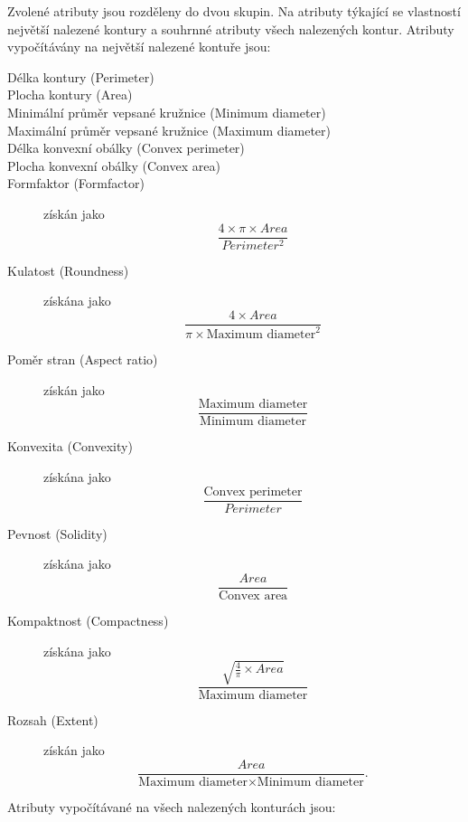 Zvolené atributy jsou rozděleny do dvou skupin. Na atributy týkající se vlastností největší nalezené kontury a souhrnné atributy všech nalezených kontur. Atributy vypočítávány na největší nalezené kontuře jsou:
\begin{description}
\item [Délka kontury (Perimeter)]
\item [Plocha kontury (Area)]
\item [Minimální průměr vepsané kružnice (Minimum diameter)]
\item [Maximální průměr vepsané kružnice (Maximum diameter)]
\item [Délka konvexní obálky (Convex perimeter)]
\item [Plocha konvexní obálky (Convex area)]
\item [Formfaktor (Formfactor)] získán jako 
    \begin{equation}
        \frac{4 \times \pi \times Area}{Perimeter^{2}}        
    \end{equation}
\item [Kulatost (Roundness)] získána jako 
    \begin{equation}
        \frac{4 \times Area}{\pi \times \text{Maximum diameter}^{2}}
    \end{equation}
\item [Poměr stran (Aspect ratio)] získán jako
	\begin{equation}
        \frac{\text{Maximum diameter}}{\text{Minimum diameter}}
	\end{equation}
\item [Konvexita (Convexity)] získána jako
	\begin{equation}
        \frac{\text{Convex perimeter}}{Perimeter}
	\end{equation}
\item [Pevnost (Solidity)] získána jako
	\begin{equation}
        \frac{Area}{\text{Convex area}}
	\end{equation}
\item [Kompaktnost (Compactness)] získána jako
	\begin{equation}
        \frac{\sqrt{\frac{4}{\pi} \times Area}}{\text{Maximum diameter}}
	\end{equation}
\item [Rozsah (Extent)] získán jako
	\begin{equation}
        \frac{Area}{\text{Maximum diameter} \times \text{Minimum diameter}} .
	\end{equation}
\end{description}
Atributy vypočítávané na všech nalezených konturách jsou:

